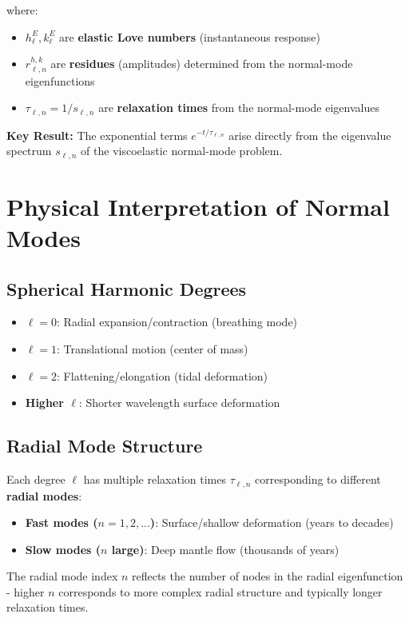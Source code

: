 \documentclass{article}
\begin{document}
where:
\begin{itemize}
\item $h_\ell^E, k_\ell^E$ are \textbf{elastic Love numbers} (instantaneous response)
\item $r_{\ell,n}^{h,k}$ are \textbf{residues} (amplitudes) determined from the normal-mode eigenfunctions
\item $\tau_{\ell,n} = 1/s_{\ell,n}$ are \textbf{relaxation times} from the normal-mode eigenvalues
\end{itemize}

\textbf{Key Result:} The exponential terms $e^{-t/\tau_{\ell,n}}$ arise directly from the eigenvalue spectrum $s_{\ell,n}$ of the viscoelastic normal-mode problem.

\section{Physical Interpretation of Normal Modes}

\subsection{Spherical Harmonic Degrees}
\begin{itemize}
\item \textbf{$\ell = 0$}: Radial expansion/contraction (breathing mode)
\item \textbf{$\ell = 1$}: Translational motion (center of mass)
\item \textbf{$\ell = 2$}: Flattening/elongation (tidal deformation)
\item \textbf{Higher $\ell$}: Shorter wavelength surface deformation
\end{itemize}

\subsection{Radial Mode Structure}

Each degree $\ell$ has multiple relaxation times $\tau_{\ell,n}$ corresponding to different \textbf{radial modes}:
\begin{itemize}
\item \textbf{Fast modes ($n=1,2,...$)}: Surface/shallow deformation (years to decades)
\item \textbf{Slow modes ($n$ large)}: Deep mantle flow (thousands of years)
\end{itemize}

The radial mode index $n$ reflects the number of nodes in the radial eigenfunction - higher $n$ corresponds to more complex radial structure and typically longer relaxation times.
\end{document}
